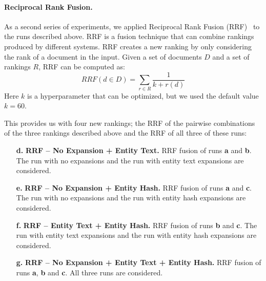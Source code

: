 

\paragraph{Reciprocal Rank Fusion.} As a second series of experiments, we applied Reciprocal Rank Fusion (RRF)~\citep{RFF} to the runs described above. RRF is a fusion technique that can combine rankings produced by different systems. RRF creates a new ranking by only considering the rank of a document in the input. Given a set of documents $D$ and a set of rankings $R$, RRF can be computed as: 
\begin{equation}
RRF(d \in D) = \sum_{r\in R}\frac{1}{k + r(d)}
\end{equation}
Here $k$ is a hyperparameter that can be optimized, but we used the default value $k=60$.

This provides us with four new rankings; the RRF of the pairwise combinations of the three rankings described above and the RRF of all three of these runs:
\begin{itemize}
\item[\textbf{d.}] \textbf{RRF -- No Expansion + Entity Text.} RRF fusion of runs \textbf{a} and \textbf{b}. The run with no expansions and the run with entity text expansions are considered.
\item[\textbf{e.}] \textbf{RRF -- No Expansion + Entity Hash.} RRF fusion of runs \textbf{a} and \textbf{c}. The run with no expansions and the run with entity hash expansions are considered.
\item[\textbf{f.}] \textbf{RRF -- Entity Text + Entity Hash.}  RRF fusion of runs \textbf{b} and \textbf{c}. The run with entity text expansions and the run with entity hash expansions are considered.
\item[\textbf{g.}] \textbf{RRF -- No Expansion + Entity Text + Entity Hash.} RRF fusion of runs \textbf{a}, \textbf{b} and \textbf{c}. All three runs are considered. 
\end{itemize}


